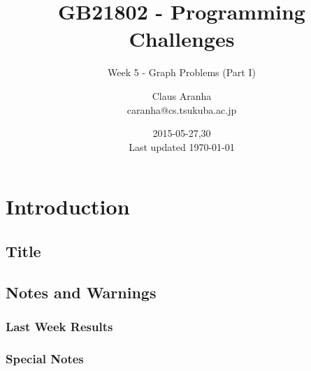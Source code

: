 \documentclass{beamer}
\title[GB21802]{GB21802 - Programming Challenges}
\subtitle[]{Week 5 - Graph Problems (Part I)}
\author[Claus Aranha]{Claus Aranha\\{\footnotesize caranha@cs.tsukuba.ac.jp}}
\institute{College of Information Science}
\date{2015-05-27,30\\{\tiny Last updated \today}}
\begin{document}
\section{Introduction}
\subsection{Title}
\begin{frame}
\maketitle
\end{frame}

\subsection{Notes and Warnings}

\begin{frame}
  \frametitle{Last Week Results}
\end{frame}

\begin{frame}
  \frametitle{Special Notes}
\end{frame}
\end{document}
